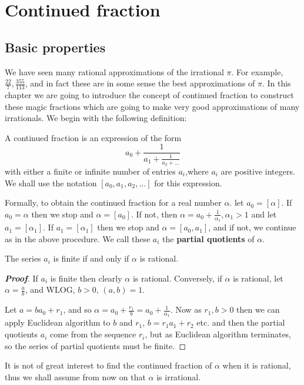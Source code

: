\section{Continued fraction}
\subsection{Basic properties}
We have seen many rational approximations of the irrational $\pi$. For example,
$\frac{22}{7}, \frac{355}{113}$, and in fact these are in some sense the best approximations of $\pi$.
In this chapter we are going to introduce the concept of continued fraction to construct these magic fractions which are going to make very good approximations of many irrationals.
We begin with the following definition:
\begin{definition} A continued fraction is an expression of the form
$$a_0+\frac{1}{a_1+\frac{1}{a_2+\ldots}}$$ with either a finite or infinite number of entries $a_i$,where $a_i$ are positive integers. We shall use the notation $[a_0,a_1,a_2,\ldots]$ for this expression.

Formally, to obtain the continued fraction for a real number $\alpha$.
let $a_0 = [\alpha]$. If $a_0 = \alpha$ then we stop and $\alpha=[a_0]$.
If not, then $\alpha=a_0+\frac{1}{\alpha_1},\alpha_1>1$ and let $a_1=[\alpha_1]$.
If $a_1=[\alpha_1]$ then we stop and $\alpha=[a_0,a_1]$, and if not, we continue as in the above
procedure. We call these $a_i$ the {\bf partial quotients} of $\alpha$.
\end{definition}
\begin{lemma} The series $a_i$ is finite if and only if $\alpha$ is rational.
\end{lemma}
\begin{proof}[\bf Proof] If $a_i$ is finite then clearly $\alpha$ is rational.
Conversely, if $\alpha$ is rational, let $\alpha=\frac{a}{b}$, and WLOG, $b>0$, $(a,b)=1$.

Let $a=ba_0+r_1$, and so $\alpha=a_0+\frac{r_1}{b}=a_0+\frac{1}{\alpha_1}$.
Now as $r_1,b>0$ then we can apply Euclidean algorithm to $b$ and $r_1$,
$b=r_1a_1+r_2$ etc. and then the partial quotients $a_i$ come from the sequence $r_i$, but as Euclidean
algorithm terminates, so the series of partial quotients must be finite.
\end{proof}

It is not of great interest to find the continued fraction of $\alpha$ when it is rational, thus we shall assume from now on that $\alpha$ is irrational.

